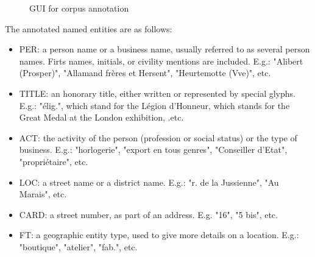 \begin{figure}[htb!]
	  \caption{\label{fig:annotator} GUI for corpus annotation}
\end{figure}

The annotated named entities are as follows:
\begin{itemize}
    \item PER: a person name or a business name, usually referred to as several person names. Firts names, initials, or civility mentions are included. E.g.: "Alibert (Prosper)", "Allamand frères et Hersent", "Heurtemotte (Vve)", etc.
    \item TITLE: an honorary title, either written or represented by special glyphs. E.g.: "élig.",  which stand for the Légion d'Honneur,  which stands for the Great Medal at the London exhibition, .etc.
    \item ACT: the activity of the person (profession or social status) or the type of business. E.g.: "horlogerie", "export en tous genres", "Conseiller d'Etat", "propriétaire", etc.
    \item LOC: a street name or a district name. E.g.: "r. de la Jussienne", "Au Marais", etc.
    \item CARD: a street number, as part of an address. E.g. "16", "5 bis", etc.
    \item FT: a geographic entity type, used to give more details on a location. E.g.: "boutique", "atelier", "fab.", etc.
\end{itemize}

